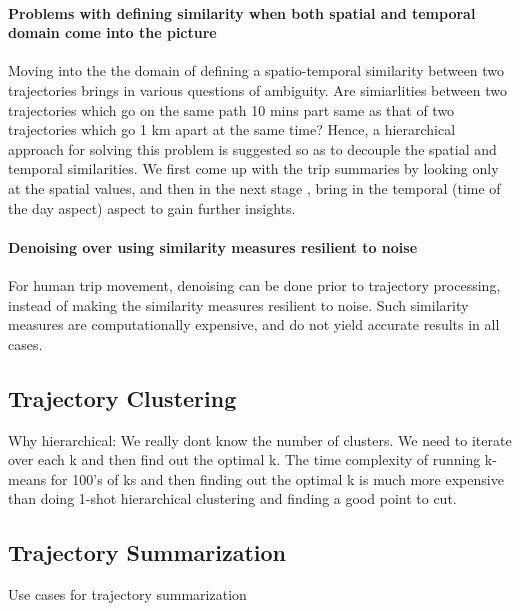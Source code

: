 \paragraph{Problems with defining similarity when both spatial and temporal domain come into the picture}

\par Moving into the the domain of defining a spatio-temporal similarity between two trajectories brings in various questions of ambiguity. Are simiarlities between two trajectories which go on the same path 10 mins part same as that of two trajectories which go 1 km apart at the same time? Hence, a hierarchical approach for solving this problem is suggested so as to decouple the spatial and temporal similarities. We first come up with the trip summaries by looking only at the spatial values, and then in the next stage , bring in the temporal (time of the day aspect) aspect to gain further insights.

\paragraph{Denoising over using similarity measures resilient to noise}
\par For human trip movement, denoising can be done prior to trajectory processing, instead of making the similarity measures resilient to noise. Such similarity measures are computationally expensive, and do not yield accurate results in all cases.

\subsection{Trajectory Clustering}

Why hierarchical: We really dont know the number of clusters. We need to iterate over each k and then find out the optimal k. The time complexity of running k-means for 100's of ks and then finding out the optimal k is much more expensive than doing 1-shot hierarchical clustering and finding a good point to cut. %

\subsection{Trajectory Summarization}

\par { Use cases for trajectory summarization}

